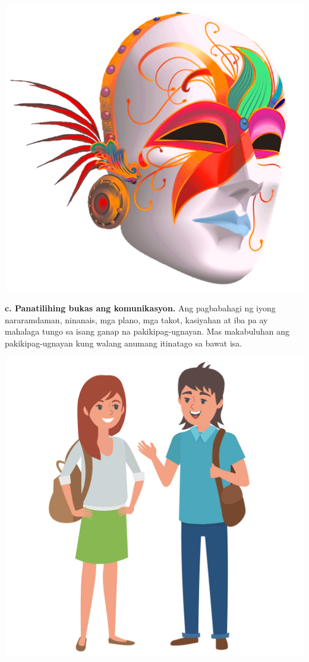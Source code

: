 \documentclass[10pt,a4paper]{article}
\begin{document}
\begin{multicols*}{3}
\begin{center}
			\includegraphics[width=0.8\linewidth]{G7_Modyul_Images/domino-mask-masquerade-ball-carnival-5aeece51301706_949867871525599825197.png}
		\end{center}
		    \textbf{c. Panatilihing bukas ang komunikasyon.} Ang pagbabahagi ng iyong nararamdaman, ninanais, mga plano, mga takot, kasiyahan at iba pa ay mahalaga tungo sa isang ganap na pakikipag-ugnayan. Mas makabuluhan ang pakikipag-ugnayan kung walang anumang itinatago sa bawat isa.\\
		\begin{center}
			\includegraphics[width=0.8\linewidth]{G7_Modyul_Images/international-student-royalty-free-illustration-exchange-of-men-and-women.png}

\end{center}
\end{multicols*}
\end{document}
